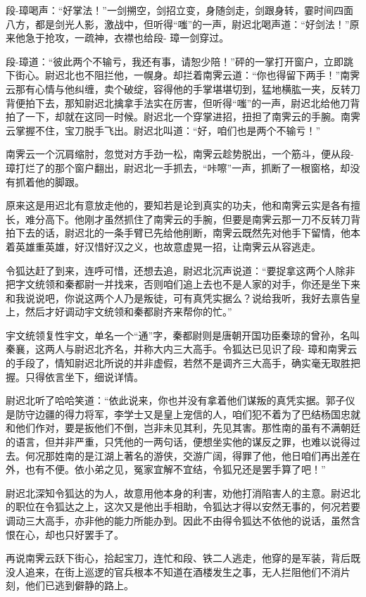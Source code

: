 \documentclass[12pt,oneside]{book}
\begin{document}
段-璋喝声：``好掌法！''一剑搠空，剑招立变，身随剑走，剑跟身转，霎时间四面八方，都是剑光人影，激战中，但听得``嗤''的一声，尉迟北喝声道：``好剑法！''原来他急于抢攻，一疏神，衣襟也给段-
璋一剑穿过。

段-璋道：``彼此两个不输亏，我还有事，请恕少陪！''砰的一掌打开窗户，立即跳下街心。尉迟北也不阻拦他，一幌身。却拦着南霁云道：``你也得留下两手！''南霁云那有心情与他纠缠，卖个破绽，容得他的手掌堪堪切到，猛地横肱一夹，反转刀背便拍下去，那知尉迟北擒拿手法实在厉害，但听得``嗤''的一声，尉迟北给他刀背拍了一下，却就在这同一时候。尉迟北一个穿掌进招，扭担了南霁云的手腕。南霁云掌握不住，宝刀脱手飞出。尉迟北叫道：``好，咱们也是两个不输亏！''

南霁云一个沉肩缩肘，忽觉对方手劲一松，南霁云趁势脱出，一个筋斗，便从段-
璋打烂了的那个窗户翻出，尉迟北一手抓去，``咔嚓''一声，抓断了一根窗格，却没有抓着他的脚跟。

原来这是用迟北有意放走他的，要知若是论到真实的功夫，他和南霁云实是各有擅长，难分高下。他刚才虽然抓住了南霁云的手腕，但要是南霁云那一刀不反转刀背拍下去的话，尉迟北的一条手臂已先给他削断，南霁云既然先对他手下留情，他本着英雄重英雄，好汉惜好汉之义，也故意虚晃一招，让南霁云从容逃走。

令狐达赶了到来，连呼可惜，还想去追，尉迟北沉声说道：``要捉拿这两个人除非把字文统领和秦都尉一并找来，否则咱们追上去也不是人家的对手，你还是坐下来和我说说吧，你说这两个人乃是叛徒，可有真凭实据么？说给我听，我好去禀告皇上，然后才好调动宇文统领和秦都尉齐来帮你的忙。''

宇文统领复性宇文，单名一个``通''字，秦都尉则是唐朝开国功臣秦琼的曾孙，名叫秦襄，这两人与尉迟北齐名，并称大内三大高手。令狐达已见识了段-
璋和南霁云的手段了，情知尉迟北所说的并非虚假，若然不是调齐三大高手，确实毫无取胜把握。只得依言坐下，细说详情。

尉迟北听了哈哈笑道：``依此说来，你也并没有拿着他们谋叛的真凭实据。郭子仪是防守边疆的得力将军，李学士又是皇上宠信的人，咱们犯不着为了巴结杨国忠就和他们作对，要是扳他们不倒，岂非未见其利，先见其害。那性南的虽有不满朝廷的语言，但并非严重，只凭他的一两句话，便想坐实他的谋反之罪，也难以说得过去。何况那姓南的是江湖上著名的游侠，交游广阔，得罪了他，他日咱们再出差在外，也有不便。依小弟之见，冤家宜解不宜结，令狐兄还是罢手算了吧！''

尉迟北深知令狐达的为人，故意用他本身的利害，劝他打消陷害人的主意。尉迟北的职位在令狐达之上，这次又是他出手相助，令狐达才得以安然无事的，何况若要调动三大高手，亦非他的能力所能办到。因此不由得令狐达不依他的说话，虽然含恨在心，却也只好罢手了。

再说南霁云跃下街心，拾起宝刀，连忙和段、铁二人逃走，他穿的是军装，背后既没人追来，在街上巡逻的官兵根本不知道在酒楼发生之事，无人拦阻他们不消片刻，他们已逃到僻静的路上。
\end{document}
